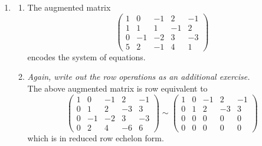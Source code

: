 \begin{enumerate}
As a double check note that 
\[
\left(\begin{array}{rrr}
1&3&0\\1&-2&1\\2&1&1
\end{array}\right)\  \begin{pmatrix}\frac{11}5\\ \frac35\\ 0\end{pmatrix}=\begin{pmatrix}4\\ 1\\ 5\end{pmatrix}
\mbox{ and }
\left(\begin{array}{rrr}
1&3&0\\1&-2&1\\2&1&1
\end{array}\right)\ \begin{pmatrix}-\frac35\\\frac15\\1\end{pmatrix}=\begin{pmatrix}0\\0\\0\end{pmatrix}\, .
\]


\item

\begin{enumerate}
\item The augmented matrix 
\[
\left(\begin{array}{rrrr|r}
1&0&-1&2&-1\\[1mm]
1&1&1&-1&2\\[1mm]
0&-1&-2&3&-3\\[1mm]
5&2&-1&4&1
\end{array}\right)
\]
encodes the system of equations. 
\item 
{\itshape Again, write out the row operations as an additional exercise.}\\
The above augmented matrix is row equivalent to  
\[
\left(\begin{array}{rrrr|r}
1&0&-1&2&-1\\[1mm]
0&1&2&-3&3\\[1mm]
0&-1&-2&3&-3\\[1mm]
0&2&4&-6&6
\end{array}\right)
\sim
\left(\begin{array}{rrrr|r}
1&0&-1&2&-1\\[1mm]
0&1&2&-3&3\\[1mm]
0&0&0&0&0\\[1mm]
0&0&0&0&0
\end{array}\right)
\]
which is in reduced row echelon form.


\end{enumerate}
\end{enumerate}
